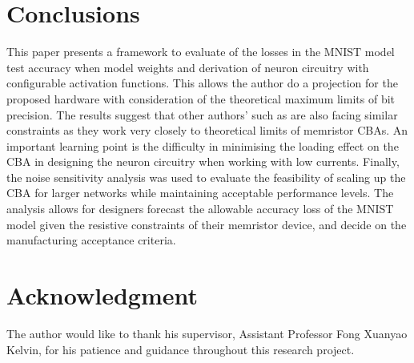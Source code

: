 \section{Conclusions}

This paper presents a framework to evaluate of the losses in the MNIST model test accuracy when model weights and derivation of neuron circuitry with configurable activation functions. This allows the author do a projection for the proposed hardware with consideration of the theoretical maximum limits of bit precision. The results suggest that other authors' such as \citet{PengGu2015} \cite{PengGu2015} are also facing similar constraints as they work very closely to theoretical limits of memristor CBAs. An important learning point is the difficulty in minimising the loading effect on the CBA in designing the neuron circuitry when working with low currents. Finally, the noise sensitivity analysis was used to evaluate the feasibility of scaling up the CBA for larger networks while maintaining acceptable performance levels. The analysis 
allows for designers forecast the allowable accuracy loss of the MNIST model given the resistive constraints of their memristor device, and decide on the manufacturing acceptance criteria.

\section*{Acknowledgment}

The author would like to thank his supervisor, Assistant Professor Fong Xuanyao Kelvin, for his patience and guidance throughout this research project.

